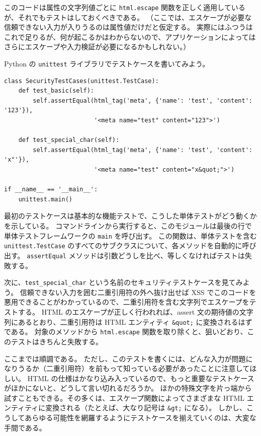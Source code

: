 \documentclass[uplatex]{jsarticle}
\begin{document}
このコードは属性の文字列値ごとに \texttt{html.escape} 関数を正しく適用しているが、それでもテストはしておくべきである。
（ここでは、エスケープが必要な信頼できない入力が入りうるのは属性値だけだと仮定する。
実際にはふつうはこれで足りるが、何が起こるかはわからないので、アプリケーションによってはさらにエスケープや入力検証が必要になるかもしれない。）

Python の \texttt{unittest} ライブラリでテストケースを書いてみよう。

\begin{verbatim}
class SecurityTestCases(unittest.TestCase):
    def test_basic(self):
        self.assertEqual(html_tag('meta', {'name': 'test', 'content': '123'}),
                         '<meta name="test" content="123">')

    def test_special_char(self):
        self.assertEqual(html_tag('meta', {'name': 'test', 'content': 'x"'}),
                         '<meta name="test" content="x&quot;">')

if __name__ == '__main__':
    unittest.main()
\end{verbatim}

最初のテストケースは基本的な機能テストで、こうした単体テストがどう動くかを示している。
コマンドラインから実行すると、このモジュールは最後の行で単体テストフレームワークの \texttt{main} を呼び出す。
この関数は、単体テストを含む \texttt{unittest.TestCase} のすべてのサブクラスについて、各メソッドを自動的に呼び出す。
\texttt{assertEqual} メソッドは引数どうしを比べ、等しくなければテストは失敗する。

次に、\texttt{test\_special\_char} という名前のセキュリティテストケースを見てみよう。
信頼できない入力を囲む二重引用符の外へ抜け出せば XSS でこのコードを悪用できることがわかっているので、二重引用符を含む文字列でエスケープをテストする。
HTML のエスケープが正しく行われれば、assert 文の期待値の文字列にあるとおり、二重引用符は HTML エンティティ \texttt{\&quot;} に変換されるはずである。
対象のメソッドから \texttt{html.escape} 関数を取り除くと、狙いどおり、このテストはきちんと失敗する。

ここまでは順調である。
ただし、このテストを書くには、どんな入力が問題になりうるか（二重引用符）を前もって知っている必要があったことに注意してほしい。
HTML の仕様はかなり込み入っているので、もっと重要なテストケースがほかにないと、どうして言い切れるだろうか。
ほかの特殊文字を片っ端から試すこともできる。その多くは、エスケープ関数によってさまざまな HTML エンティティに変換される（たとえば、大なり記号は \texttt{\&gt;} になる）。
しかし、こうしてあらゆる可能性を網羅するようにテストケースを揃えていくのは、大変な手間である。
\end{document}
